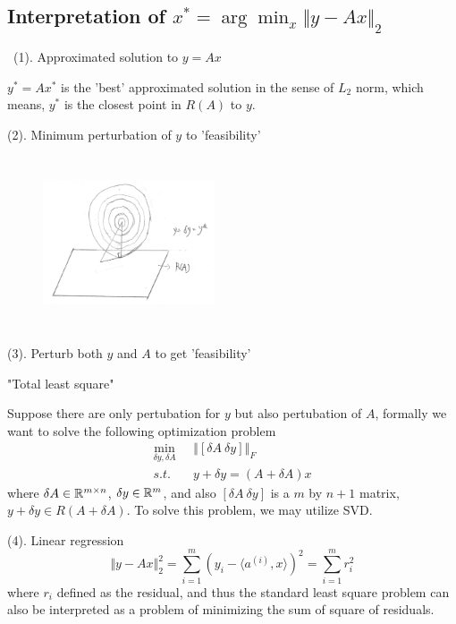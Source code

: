 \vspace{0.3cm}
\subsection{Interpretation of $x^*= \arg \min_x \Vert y-Ax\Vert_2$}


\quad\ (1). Approximated solution to $y=Ax$

$y^*=Ax^*$ is the 'best' approximated solution in the sense of $L_2$ norm, which means, $y^*$ is the closest point in $R(A)$ to $y$.

(2). Minimum perturbation of $y$ to 'feasibility'

\begin{figure}
	\centering
	\includegraphics[width=2in,height=2in]{figures/ch06/ch06-01.jpg}
\end{figure}

(3). Perturb both $y$ and $A$ to get 'feasibility'

"Total least square"

Suppose there are only pertubation for $y$ but also pertubation of $A$, formally we want to solve the following optimization problem
\begin{align*}
\min_{\delta y,  \delta A} & \left\Vert [\delta A\ \delta y] \right\Vert_F \\
s.t.\quad& y +\delta y = (A + \delta A) x
\end{align*}
where $\delta A\in \mathbb{R}^{m\times n}$, $\delta y \in\mathbb{R}^m$,  and also $[\delta A\ \delta y]$ is a $m$ by $n+1$ matrix, $y+\delta y\in R(A+\delta A)$. To solve this problem, we may utilize SVD.


(4). Linear regression
$$\Vert y-Ax\Vert ^2_2 = \sum_{i=1}^{m} ( y_i - \langle a^{(i)} , x\rangle )^2 = \sum_{i=1}^{m} r_i^2$$
where $r_i$ defined as the residual, and thus the standard least square problem can also be interpreted as a problem of minimizing the sum of square of residuals.

